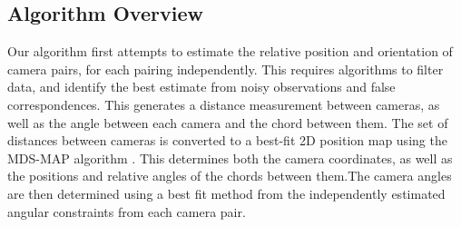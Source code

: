\documentclass[journal]{IEEEtran}
\begin{document}
	\subsection{Algorithm Overview}
		\indent Our algorithm first attempts to estimate the relative position and orientation of camera pairs, for each pairing independently. This requires algorithms to filter data, and identify the best estimate from noisy observations and false correspondences. This generates a distance measurement between cameras, as well as the angle between each camera and the chord between them. The set of distances between cameras is converted to a best-fit 2D position map using the MDS-MAP algorithm \cite{shang2003}. This determines both the camera coordinates, as well as the positions and relative angles of the chords between them.The camera angles are then determined using a best fit method from the independently estimated angular constraints from each camera pair.
		
\end{document}
